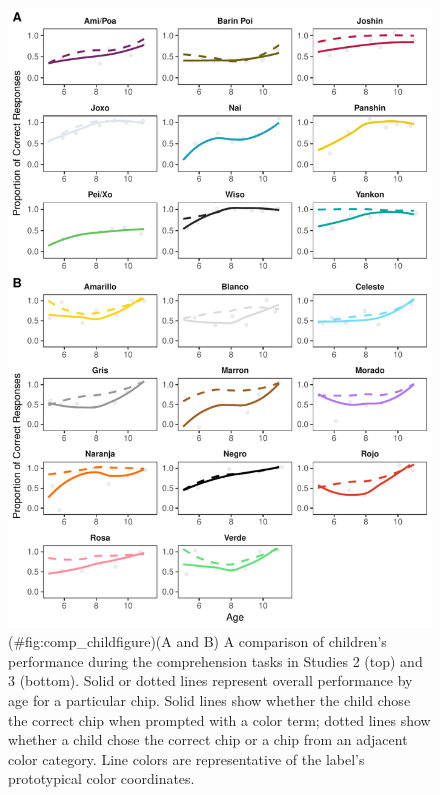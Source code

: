 \documentclass[
  english,
  ,man,floatsintext]{apa6}
\begin{document}
\begin{figure}
\centering
\includegraphics{amazon_color_files/figure-latex/comp_childfigure-1.pdf}
\caption{(\#fig:comp\_childfigure)(A and B) A comparison of children's performance during the comprehension tasks in Studies 2 (top) and 3 (bottom). Solid or dotted lines represent overall performance by age for a particular chip. Solid lines show whether the child chose the correct chip when prompted with a color term; dotted lines show whether a child chose the correct chip or a chip from an adjacent color category. Line colors are representative of the label's prototypical color coordinates.}
\end{figure}
\end{document}
